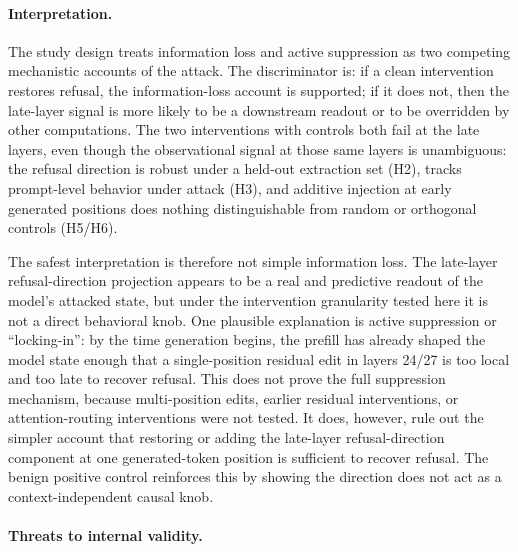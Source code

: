 \documentclass{article}
\begin{document}
\paragraph{Interpretation.}
The study design treats information loss and active suppression as
two competing mechanistic accounts of the attack. The discriminator is:
if a clean intervention restores refusal, the information-loss account
is supported; if it does not, then the late-layer signal is more likely
to be a downstream readout or to be overridden by other computations.
The two interventions with controls both fail at the late layers,
even though the observational signal at those same layers is unambiguous:
the refusal direction is robust under a held-out extraction set (H2),
tracks prompt-level behavior under attack (H3), and additive injection
at early generated positions does nothing distinguishable from random or
orthogonal controls (H5/H6).

The safest interpretation is therefore not simple information loss. The
late-layer refusal-direction projection appears to be a real and
predictive readout of the model's attacked state, but under the
intervention granularity tested here it is not a direct behavioral knob.
One plausible explanation is active suppression or ``locking-in'': by
the time generation begins, the prefill has already shaped the model
state enough that a single-position residual edit in layers 24/27 is too
local and too late to recover refusal. This does not prove the full
suppression mechanism, because multi-position edits, earlier residual
interventions, or attention-routing interventions were not tested. It
does, however, rule out the simpler account that restoring or adding the
late-layer refusal-direction component at one generated-token position
is sufficient to recover refusal. The benign positive control reinforces
this by showing the direction does not act as a context-independent
causal knob.

\paragraph{Threats to internal validity.}
\end{document}
